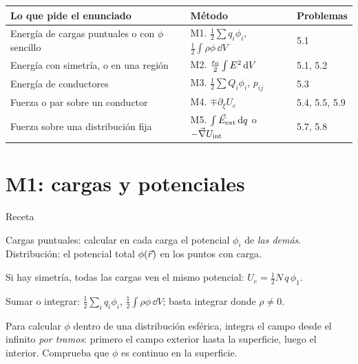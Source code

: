 \begin{center}
\small
\begin{tabularx}{\textwidth}{@{}>{\raggedright\arraybackslash}X>{\raggedright\arraybackslash}p{5.0cm}l@{}}
\toprule
Lo que pide el enunciado & Método & Problemas\\
\midrule
Energía de cargas puntuales o con $\phi$ sencillo & M1. $\frac12\sum q_i\phi_i$,\ \ $\frac12\int\rho\phi\,\dd V$ & 5.1\\
Energía con simetría, o en una región & M2. $\frac{\varepsilon_0}{2}\int E^2\mathop{}\!\mathrm{d} V$ & 5.1, 5.2\\
Energía de conductores & M3. $\frac12\sum Q_i\phi_i$, $p_{ij}$ & 5.3\\
Fuerza o par sobre un conductor & M4. $\mp\partial_\xi U_e$ & 5.4, 5.5, 5.9\\
Fuerza sobre una distribución fija & M5. $\int\vec E_{\mathrm{ext}}\mathop{}\!\mathrm{d} q$ o $-\vec\nabla U_{\mathrm{int}}$ & 5.7, 5.8\\
\bottomrule
\end{tabularx}
\end{center}

\section{M1: cargas y potenciales}\label{gsec:m1}

\begin{metodo}{Receta}
\begin{pasos}
  \item Cargas puntuales: calcular en cada carga el potencial $\phi_i$ de \emph{las demás}. Distribución: el potencial total $\phi(\vec r)$ en los puntos con carga.
  \item Si hay simetría, todas las cargas ven el mismo potencial: $U_e=\frac12N\,q\,\phi_1$.
  \item Sumar o integrar: $\frac12\sum_iq_i\phi_i$, $\frac12\int\rho\phi\,\dd V$; basta integrar donde $\rho\neq0$.
\end{pasos}
\end{metodo}

\begin{consejo}
Para calcular $\phi$ dentro de una distribución esférica, integra el campo desde el infinito \emph{por tramos}: primero el campo exterior
hasta la superficie, luego el interior. Comprueba que $\phi$ es continuo en la superficie.
\end{consejo}

